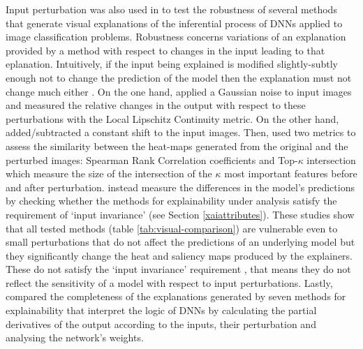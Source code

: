 \documentclass[final,1p,times]{elsarticle}
\begin{document}
Input perturbation was also used in \cite{alvarez2018robustness, ghorbani2017interpretation, kindermans2017reliability} to test the robustness of several methods that generate visual explanations of the inferential process of DNNs applied to image classification problems. 
Robustness concerns variations of an explanation provided by a method  with respect to changes in the input leading to that eplanation. Intuitively, if the input being explained is modified slightly-subtly enough  not to change the prediction of the model then the explanation must not change much either \cite{alvarez2018robustness}. On the one hand, \cite{alvarez2018robustness} applied a Gaussian noise to input images and measured the relative changes in the output with respect to these perturbations with the Local Lipschitz Continuity metric. On the other hand, \cite{ghorbani2017interpretation, kindermans2017reliability} added/subtracted a constant shift to the input images. Then, \cite{ghorbani2017interpretation} used two metrics to assess the similarity between the heat-maps generated from the original and the perturbed images: Spearman Rank Correlation coefficients and Top-$\kappa$ intersection which measure the size of the intersection of the $\kappa$ most important features before and after perturbation. \cite{kindermans2017reliability} instead measure the differences in the model's predictions by checking whether the methods for explainability under analysis satisfy the requirement of `input invariance' (see Section \ref{xaiattributes}). These studies show that all tested methods (table \ref{tab:visual-comparison}) are vulnerable even to small perturbations that do not affect the predictions of an underlying model but they  significantly change the heat and saliency maps produced by the explainers. These do not satisfy the `input invariance' requirement \cite{kindermans2017reliability}, that means they do not reflect the sensitivity of a model with respect to input perturbations.
Lastly, \cite{gevrey2003review} compared the completeness of the explanations generated by seven methods for explainability that interpret the logic of  DNNs by calculating the partial derivatives of the output according to the inputs, their perturbation and analysing the network's weights.
\end{document}
